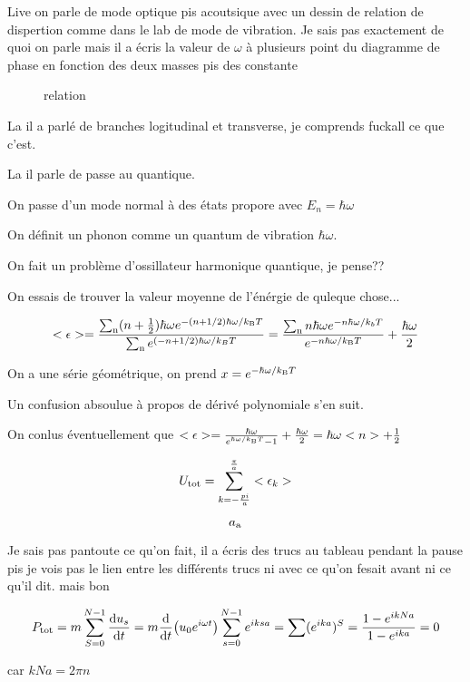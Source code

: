


Live on parle de mode optique pis acoutsique avec un dessin de relation de dispertion comme dans le lab de mode de vibration. Je sais pas exactement de quoi on parle mais il a écris la valeur de $\omega$ à plusieurs point du diagramme de phase en fonction des deux masses pis des constante

\begin{figure}[ht]
    \centering
    \caption{relation}
    \label{fig:relation}
\end{figure}

La il a parlé de branches logitudinal et transverse, je comprends fuckall ce que c'est.

La il parle de passe au quantique.

On passe d'un mode normal à des états propore avec $E_n= \hbar\omega$ 

On définit un phonon comme un quantum de vibration $\hbar\omega.$ 

On fait un problème d'ossillateur harmonique quantique, je pense??

On essais de trouver la valeur moyenne de l'énérgie de quleque chose...

$$<\epsilon> = \frac{\sum_{\rm n}(n + \frac{1}{2}) \hbar \omega e^{-(n+1/2)\hbar\omega/k_{\rm B}T}}{\sum_{\rm n}e^{(-n+1/2)\hbar\omega/k_BT}} = \frac{\sum_{\rm n}n\hbar\omega e^{-n\hbar\omega/k_bT}}{e^{-n\hbar\omega/k_{\rm B}T}} + \frac{\hbar\omega}{2} $$ 

On a une série géométrique, on prend $x = e^{-\hbar\omega/k_{\rm B}T}$ 

Un confusion absoulue à propos de dérivé polynomiale s'en suit.

On conlus éventuellement que $<\epsilon>=\frac{\hbar\omega}{e^{\hbar\omega/k_{\rm B}T}-1} + \frac{\hbar\omega}{2} = \hbar\omega <n> + \frac{1}{2}  $ 

$$U_{\rm tot} = \sum_{k=-\frac{pi}{a}}^{\frac{\pi}{a} }<\epsilon_k>$$ 

$$a_{\rm a}$$ 

Je sais pas pantoute ce qu'on fait, il a écris des trucs au tableau pendant la pause pis je vois pas le lien entre les différents trucs ni avec ce qu'on fesait avant ni ce qu'il dit. mais bon

$$P_{\rm tot} =  m \sum_{S=0}^{N-1} \dv{u_s}{t} = m \dv{t} (u_0e^{i\omega t})\sum_{s=0}^{N-1} e^{iksa} = \sum (e^{ika})^S = \frac{1 - e^{ikNa}}{1-e^{ika}} = 0$$

car $kNa = 2\pi n$ 

